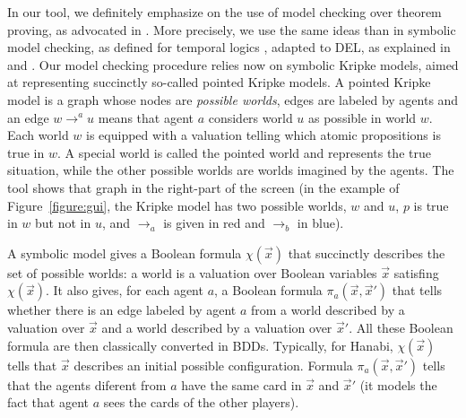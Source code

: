 In our tool, we definitely emphasize on the use of model checking over theorem proving, as advocated in \cite{DBLP:conf/kr/HalpernV91}. More precisely, we use the same ideas than in symbolic model checking, as defined for temporal logics \cite{DBLP:conf/lics/BurchCMDH90}, adapted to DEL, as explained in \cite{DBLP:conf/atal/CharrierS17} and \cite{DBLP:conf/aiml/CharrierS18}. Our model checking procedure relies now on symbolic Kripke models, aimed at representing succinctly so-called pointed Kripke models. A pointed Kripke model is a graph whose nodes are \emph{possible worlds}, edges are labeled by agents and an edge $w \rightarrow^a u$ means that agent $a$ considers world $u$ as possible in world $w$. Each world $w$ is equipped with a valuation telling which atomic propositions is true in $w$. A special world is called the pointed world and represents the true situation, while the other possible worlds are worlds imagined by the agents.
The tool shows that graph in the right-part of the screen (in the example of Figure~\ref{figure:gui}, the Kripke model has two possible worlds, $w$ and $u$, $p$ is true in $w$ but not in $u$, and $\rightarrow_a$ is given in red and $\rightarrow_b$ in blue). 


\newcommand{\succinctsetworlds}{\chi}
\newcommand{\succinctrelation}[1]{\pi_{#1}}
 A symbolic model gives a Boolean formula $\succinctsetworlds(\vec x)$ that succinctly  describes the set of possible worlds: a world is a valuation over Boolean variables $\vec x$ satisfing $\succinctsetworlds(\vec x)$. It also gives, for each agent $a$, a Boolean formula $\succinctrelation a(\vec x, \vec x')$ that tells whether there is an edge labeled by agent $a$ from a world described by a valuation over $\vec x$ and  a world described by a valuation over $\vec x'$. All these Boolean formula are then classically converted in BDDs. %
%
%
Typically, for Hanabi, $\succinctsetworlds(\vec x)$ tells that $\vec x$ describes an initial possible configuration. Formula $\succinctrelation a(\vec x, \vec x')$ tells that the agents diferent from $a$ have the same card in $\vec x$ and $\vec x'$ (it models the fact that agent $a$ sees the cards of the other players).

